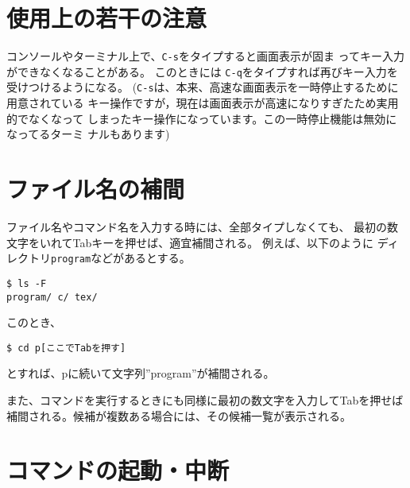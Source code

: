 \documentclass{jreport}
\begin{document}
\section{使用上の若干の注意}

 コンソールやターミナル上で、\verb|C-s|をタイプすると画面表示が固ま
ってキー入力ができなくなることがある。
このときには \verb|C-q|をタイプすれば再びキー入力を受けつけるようになる。
(\verb|C-s|は、本来、高速な画面表示を一時停止するために用意されている
キー操作ですが，現在は画面表示が高速になりすぎたため実用的でなくなって
しまったキー操作になっています。この一時停止機能は無効になってるターミ
ナルもあります)

\section{ファイル名の補間}

ファイル名やコマンド名を入力する時には、全部タイプしなくても、
最初の数文字をいれてTabキーを押せば、適宜補間される。
例えば、以下のように ディレクトリ\verb|program|などがあるとする。
\begin{screen}
\begin{verbatim}
$ ls -F
program/ c/ tex/
\end{verbatim}
\end{screen}
このとき、
\begin{screen}
\begin{verbatim}
$ cd p[ここでTabを押す]
\end{verbatim}
\end{screen}
とすれば、pに続いて文字列''program''が補間される。

また、コマンドを実行するときにも同様に最初の数文字を入力してTabを押せば
補間される。候補が複数ある場合には、その候補一覧が表示される。

\section{コマンドの起動・中断}
\end{document}
